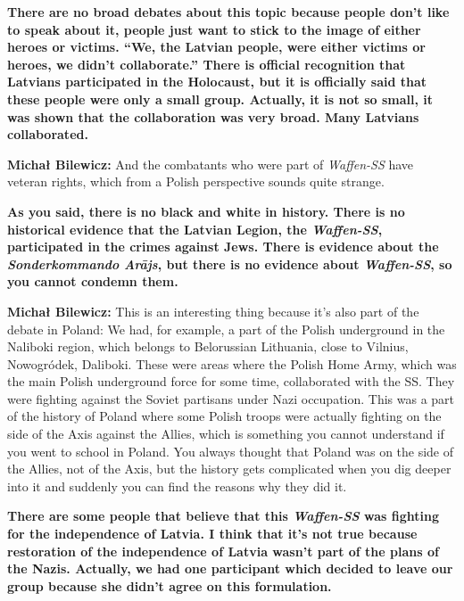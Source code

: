 \textbf{There are no broad debates about this topic because people don't like to speak about it, people just want to stick to the image of either heroes or victims. ``We, the Latvian people, were either victims or heroes,  we didn’t collaborate.'' There is official recognition that Latvians participated in the Holocaust, but it is officially said that these people were only a small group. Actually, it is not so small, it was shown that the collaboration was very broad. Many Latvians collaborated.} 

\textbf{Michał Bilewicz:} And the combatants who were part of \textit{Waffen-SS} have veteran rights, which from a Polish perspective sounds quite strange. 

\textbf{As you said, there is no black and white in history. There is no historical evidence that the Latvian Legion, the \textit{Waffen-SS}, participated in the crimes against Jews. There is evidence about the \textit{Sonderkommando Arājs}, but there is no evidence about \textit{Waffen-SS}, so you cannot condemn them.}

\textbf{Michał Bilewicz:} This is an interesting thing because it's also part of the debate in Poland: We had, for example, a part of the Polish underground in the Naliboki region, which belongs to Belorussian Lithuania, close to Vilnius, Nowogródek, Daliboki. These were areas where the Polish Home Army, which was the main Polish underground force for some time, collaborated with the SS. They were fighting against the Soviet partisans under Nazi occupation. This was a part of the history of Poland where some Polish troops were actually fighting on the side of the Axis against the Allies, which is something you cannot understand if you went to school in Poland. You always thought that Poland was on the side of the Allies, not of the Axis, but the history gets complicated when you dig deeper into it and suddenly you can find the reasons why they did it. 

\textbf{There are some people that believe that this \textit{Waffen-SS} was fighting for the independence of Latvia. I think that it’s not true because restoration of the independence of Latvia wasn't part of the plans of the Nazis. Actually, we had one participant which decided to leave our group because she didn't agree on this formulation.} 

